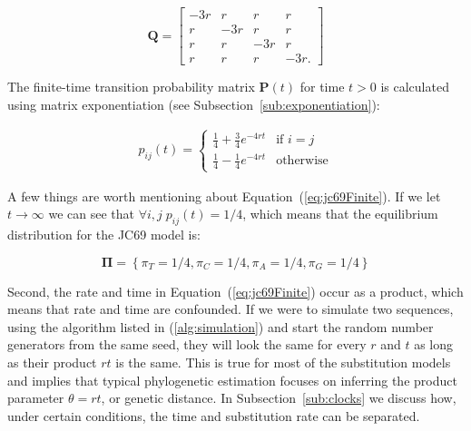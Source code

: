 \begin{equation}
\mathbf{Q}=\left[\begin{array}{cccc}
-3r & r & r & r\\
r & -3r & r & r\\
r & r & -3r & r\\
r & r & r & -3r.
\end{array}\right]
\label{eq:jc69}
\end{equation}

\noindent
The finite-time transition probability matrix $\mathbf{P}(t)$ for time $t>0$ is calculated using matrix exponentiation  (see Subsection~\ref{sub:exponentiation}):

\begin{align}
p_{ij}\left(t\right)=\begin{cases}
\frac{1}{4}+\frac{3}{4}e^{-4rt} & \text{if }i=j\\
\frac{1}{4}-\frac{1}{4}e^{-4rt} & \text{otherwise}
\end{cases}
\label{eq:jc69Finite}
\end{align}

\noindent
A few things are worth mentioning about Equation~(\ref{eq:jc69Finite}).
If we let $t\rightarrow \infty$ we can see that $\forall i,j\; p_{ij}(t)=1/4$, which means that the equilibrium distribution for the JC69 model is: 

\begin{equation}
\mathbf{\Pi}=\left\{ \pi_{T}=1/4,\pi_{C}=1/4,\pi_{A}=1/4,\pi_{G}=1/4\right\}
\label{eq:jc69Steady}
\end{equation}

\noindent
Second, the rate and time in Equation~(\ref{eq:jc69Finite}) occur as a product, which means that rate and time are confounded.
If we were to simulate two sequences, using the algorithm listed in (\ref{alg:simulation}) and start the random number generators from the same seed, they will look the same for every $r$ and $t$ as long as their product $rt$ is the same.
This is true for most of the substitution models and implies that typical phylogenetic estimation focuses on inferring the product parameter $\theta=rt$, or genetic distance.
In Subsection~\ref{sub:clocks} we discuss how, under certain conditions, the time and substitution rate can be separated.

